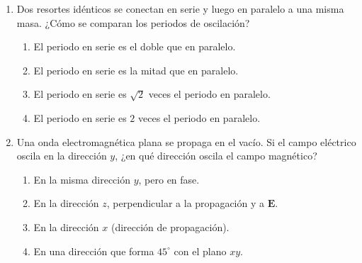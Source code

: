 \documentclass[12pt]{article}
\begin{document}
\begin{enumerate}
\item Dos resortes idénticos se conectan en serie y luego en paralelo a una misma masa. ¿Cómo se comparan los periodos de oscilación?
\begin{enumerate}[label=(\alph*)]
\item El periodo en serie es el doble que en paralelo.
\item El periodo en serie es la mitad que en paralelo.
\item El periodo en serie es $\sqrt{2}$ veces el periodo en paralelo.
\item El periodo en serie es $2$ veces el periodo en paralelo.
\end{enumerate}

\item Una onda electromagnética plana se propaga en el vacío. Si el campo eléctrico oscila en la dirección $y$, ¿en qué dirección oscila el campo magnético?
\begin{enumerate}[label=(\alph*)]
\item En la misma dirección $y$, pero en fase.
\item En la dirección $z$, perpendicular a la propagación y a $\mathbf{E}$.
\item En la dirección $x$ (dirección de propagación).
\item En una dirección que forma $45^\circ$ con el plano $xy$.
\end{enumerate}

\end{enumerate}
\end{document}
